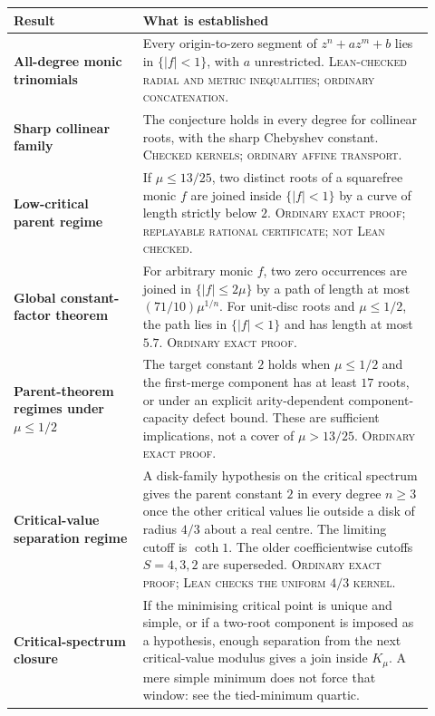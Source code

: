 {\small
\renewcommand{\arraystretch}{1.18}
\begin{tabular}{@{}
  >{\raggedright\arraybackslash}p{0.29\linewidth}
  >{\raggedright\arraybackslash}p{0.63\linewidth}@{}}
\toprule
\textbf{Result} & \textbf{What is established} \\
\midrule
\textbf{All-degree monic trinomials} &
Every origin-to-zero segment of $z^n+az^m+b$ lies in $\{|f|<1\}$, with $a$
unrestricted.  \textsc{Lean-checked radial and metric inequalities; ordinary
concatenation.} \\
\addlinespace
\textbf{Sharp collinear family} &
The conjecture holds in every degree for collinear roots, with the sharp
Chebyshev constant.  \textsc{Checked kernels; ordinary affine transport.} \\
\addlinespace
\textbf{Low-critical parent regime} &
If $\mu\le13/25$, two distinct roots of a squarefree monic $f$ are joined
inside $\{|f|<1\}$ by a curve of length strictly below $2$.
\textsc{Ordinary exact proof; replayable rational certificate; not Lean
checked.} \\
\addlinespace
\textbf{Global constant-factor theorem} &
For arbitrary monic $f$, two zero occurrences are joined in
$\{|f|\le2\mu\}$ by a path of length at most
$(71/10)\mu^{1/n}$.  For unit-disc roots and $\mu\le1/2$, the path lies in
$\{|f|<1\}$ and has length at most $5.7$.
\textsc{Ordinary exact proof.} \\
\addlinespace
\textbf{Parent-theorem regimes under $\mu\le1/2$} &
The target constant $2$ holds when $\mu\le1/2$ and the first-merge component
has at least $17$ roots, or under an explicit arity-dependent
component-capacity defect bound.  These are sufficient implications, not a
cover of $\mu>13/25$.  \textsc{Ordinary exact proof.} \\
\addlinespace
\textbf{Critical-value separation regime} &
A disk-family hypothesis on the critical spectrum gives the parent constant
$2$ in every degree $n\ge3$ once the other critical values lie outside a
disk of radius $4/3$ about a real centre.  The limiting cutoff is
$\coth1$.  The older coefficientwise cutoffs $S=4,3,2$ are superseded.
\textsc{Ordinary exact proof; Lean checks the uniform $4/3$ kernel.} \\
\addlinespace
\textbf{Critical-spectrum closure} &
If the minimising critical point is unique and simple, or if a two-root
component is imposed as a hypothesis, enough separation from the next
critical-value modulus gives a join inside $K_\mu$.  A mere simple
minimum does not force that window: see the tied-minimum quartic.

\end{tabular}}

